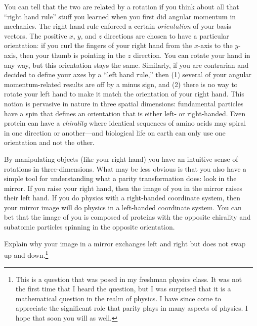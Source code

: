 \begin{subappendices}
You can tell that the two are related by a rotation if you think about all that ``right hand rule'' stuff you learned when you first did angular momentum in mechanics. The right hand rule enforced a certain \emph{orientation} of your basis vectors. The positive $x$, $y$, and $z$ directions are chosen to have a particular orientation: if you curl the fingers of your right hand from the $x$-axis to the $y$-axis, then your thumb is pointing in the $z$ direction. You can rotate your hand in any way, but this orientation stays the same. Similarly, if you are contrarian and decided to define your axes by a ``left hand rule,'' then (1) several of your angular momentum-related results are off by a minus sign, and (2) there is no way to rotate your left hand to make it match the orientation of your right hand. This notion is pervasive in nature in three spatial dimensions: fundamental particles have a spin that defines an orientation that is either left- or right-handed. Even protein can have a \emph{chirality} where identical sequences of amino acids may spiral in one direction or another---and biological life on earth can only use one orientation and not the other. 

By manipulating objects (like your right hand) you have an intuitive sense of rotations in three-dimensions. What may be less obvious is that you also have a simple tool for understanding what a parity transformation does: look in the mirror. If you raise your right hand, then the image of you in the mirror raises their left hand. If you do physics with a right-handed coordinate system, then your mirror image will do physics in a left-handed coordinate system. You can bet that the image of you is composed of proteins with the opposite chirality and subatomic particles spinning in the opposite orientation. 
\begin{exercise}
Explain why your image in a mirror exchanges left and right but does not swap up and down.\footnote{This is a question that was posed in my freshman physics class. It was not the first time that I heard the question, but I was surprised that it is a mathematical question in the realm of physics. I have since come to appreciate the significant role that parity plays in many aspects of physics. I hope that soon you will as well.}
\end{exercise}



\end{subappendices}
